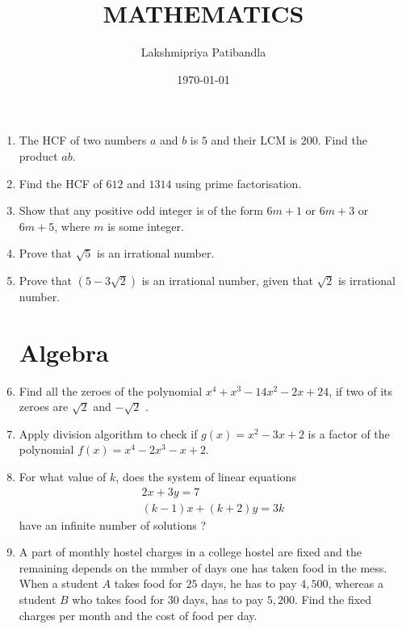 \documentclass[2pt,-letter paper]{article}
\title{MATHEMATICS}
\author{Lakshmipriya Patibandla}
\date{\today}
\providecommand{\brak}[1]{\ensuremath{\left(#1\right)}}
\begin{document}
\maketitle
\begin{enumerate}
\section{Number Systems}

\item The HCF of two numbers $a$ and $b$ is $5$ and their LCM is $200 $. Find the product $ab$.

\item Find the HCF of $612$ and $1314$ using prime factorisation.

\item Show that any positive odd integer is of the form $6m + 1$ or $6m + 3$ or $6m + 5$, where $m$ is some integer.

\item Prove that ${\sqrt 5}$ is an irrational number.

\item Prove that $\brak{5 - 3{\sqrt 2}}$ is an irrational number, given that ${\sqrt2}$ is irrational number.

\section{Algebra}

\item Find all the zeroes of the polynomial $x^4 + x^3- 14x^2 -2x + 24$, if two of its zeroes are $\sqrt2$ and $-\sqrt 2$ .

\item Apply division algorithm to check if $g\brak{x} = x^2 - 3x + 2$ is a factor of the polynomial $f\brak{x} = x^4 - 2x^3 - x + 2$.

\item For what value of $k$, does the system of linear equations\\
\begin{align*}
   2x + 3y = 7\\
 \brak{k - 1} x + \brak{k + 2} y = 3k
\end{align*}
have an infinite number of solutions ?

\item A part of monthly hostel charges in a college hostel are fixed and the remaining depends on the number of days one has taken food in the mess. When a student $A$ takes food for $25$ days, he has to pay {\rupee $4,500$}, whereas a student $B$ who takes food for $30$ days, has to pay {\rupee $5,200$}. Find the fixed charges per month and the cost of food per day.


\end{enumerate}
\end{document}
